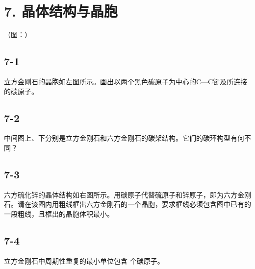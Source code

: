\section*{7. 晶体结构与晶胞}
（图：）

\subsection*{7-1}
⽴⽅⾦刚⽯的晶胞如左图所⽰。画出以两个⿊⾊碳原⼦为中⼼的C—C键及所连接的碳原⼦。

\subsection*{7-2}
中间图上、下分别是⽴⽅⾦刚⽯和六⽅⾦刚⽯的碳架结构。它们的碳环构型有何不同？

\subsection*{7-3}
六⽅硫化锌的晶体结构如右图所⽰。⽤碳原⼦代替硫原⼦和锌原⼦，即为六⽅⾦刚⽯。请在该图内⽤粗线框出六⽅⾦刚⽯的⼀个晶胞，要求框线必须包含图中已有的⼀段粗线，且框出的晶胞体积最⼩。

\subsection*{7-4}
⽴⽅⾦刚⽯中周期性重复的最⼩单位包含 个碳原⼦。
